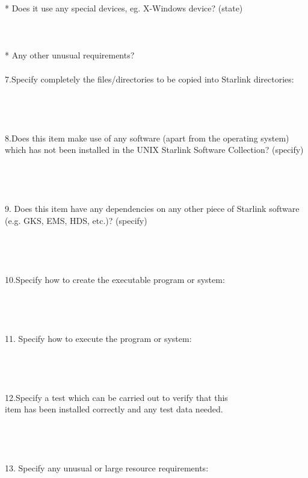 \begin{tabbing}
\>* Does it use any special devices, eg. X-Windows device? (state)\\
\\
\\
\\
\>* Any other unusual requirements?\\
\\
7.\>Specify completely the files/directories to be copied into Starlink
directories:\\
\\
\\
\\
\\
8.\>Does this item make use of any software (apart from the operating system) \\
\>which has not been installed in the UNIX Starlink Software Collection? (specify)\\
\\
\\
\\
\\
9.\> Does this item have any dependencies on any other piece of Starlink
software \\ (e.g. GKS, EMS, HDS, etc.)? (specify)\\
\\
\\
\\
\\
10.\>Specify how to create the executable program or system:\\
\\
\\
\\
\\
11. Specify how to execute the program or system:\\
\\
\\
\\
\\
12.\>Specify a test which can be carried out to verify that this\\
\>item has been installed correctly and any test data needed.\\
\\
\\
\\
\\
13. Specify any unusual or large resource requirements:\\
\\
\\
\\

\end{tabbing}
